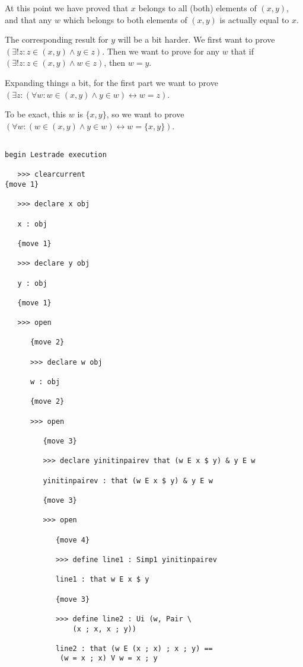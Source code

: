 \documentclass[12pt]{article}
\begin{document}
At this point we have proved that $x$ belongs to all (both) elements of $(x,y)$, and that any $w$ which belongs to both elements of $(x,y)$ is actually equal to $x$.

The corresponding result for $y$ will be a bit harder.  We first want to prove $(\exists! z: z \in (x,y) \wedge y \in z)$.
Then we want to prove for any $w$ that if $(\exists! z: z \in (x,y) \wedge w \in z)$, then $w=y$.

Expanding things a bit, for the first part we want to prove $(\exists z:(\forall w: w \in (x,y) \wedge y \in w) \leftrightarrow w=z)$.

To be exact, this $w$ is $\{x,y\}$, so we want to prove $(\forall w: (w \in (x,y) \wedge y \in w) \leftrightarrow w = \{x,y\})$.

\begin{verbatim}

begin Lestrade execution

   >>> clearcurrent
{move 1}

   >>> declare x obj

   x : obj

   {move 1}

   >>> declare y obj

   y : obj

   {move 1}

   >>> open

      {move 2}

      >>> declare w obj

      w : obj

      {move 2}

      >>> open

         {move 3}

         >>> declare yinitinpairev that (w E x $ y) & y E w

         yinitinpairev : that (w E x $ y) & y E w

         {move 3}

         >>> open

            {move 4}

            >>> define line1 : Simp1 yinitinpairev

            line1 : that w E x $ y

            {move 3}

            >>> define line2 : Ui (w, Pair \
                (x ; x, x ; y))

            line2 : that (w E (x ; x) ; x ; y) == 
             (w = x ; x) V w = x ; y


\end{verbatim}
\end{document}
